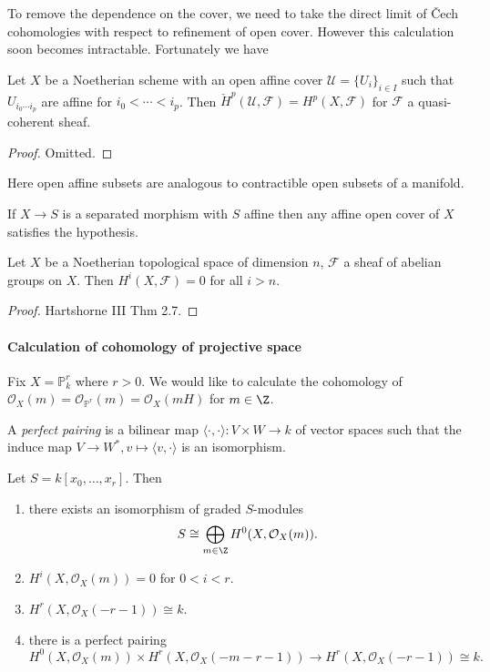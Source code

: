 \documentclass[a4paper]{article}
\renewcommand*{\P}{\mathbb{P}}
\newcommand{\sh}[1]{\mathcal{#1}} %
\begin{document}
To remove the dependence on the cover, we need to take the direct limit of Čech cohomologies with respect to refinement of open cover. However this calculation soon becomes intractable. Fortunately we have

\begin{theorem}
  Let \(X\) be a Noetherian scheme with an open affine cover \(\sh U = \{U_i\}_{i \in I}\) such that \(U_{i_0 \cdots i_p}\) are affine for \(i_0 < \cdots < i_p\). Then \(\check H^p(\mathcal U, \sh F) = H^p(X, \sh F)\) for \(\sh F\) a quasi-coherent sheaf.
\end{theorem}

\begin{proof}
  Omitted.
\end{proof}

Here open affine subsets are analogous to contractible open subsets of a manifold.

\begin{remark}
  If \(X \to S\) is a separated morphism with \(S\) affine then any affine open cover of \(X\) satisfies the hypothesis.
\end{remark}

\begin{theorem}[Grothendieck]
  Let \(X\) be a Noetherian topological space of dimension \(n\), \(\sh F\) a sheaf of abelian groups on \(X\). Then \(H^i(X, \sh F) = 0\) for all \(i > n\).
\end{theorem}

\begin{proof}
  Hartshorne III Thm 2.7.
\end{proof}

\paragraph{Calculation of cohomology of projective space}

Fix \(X = \P_k^r\) where \(r > 0\). We would like to calculate the cohomology of \(\sh O_X(m) = \sh O_{\P^r}(m) = \sh O_X(mH)\) for \(m \in \Z\).

\begin{definition}
  A \emph{perfect pairing} is a bilinear map \(\langle \cdot, \cdot \rangle: V \times W \to k\) of vector spaces such that the induce map \(V \to W^*, v \mapsto \langle v, \cdot \rangle\) is an isomorphism.
\end{definition}

\begin{theorem}
  Let \(S = k[x_0, \dots, x_r]\). Then
  \begin{enumerate}
  \item there exists an isomorphism of graded \(S\)-modules
    \[
      S \cong \bigoplus_{m \in \Z} H^0(X, \sh O_X(m)).
    \]
  \item \(H^i(X, \sh O_X(m)) = 0\) for \(0 < i < r\).
  \item \(H^r(X, \sh O_X(-r - 1)) \cong k\).
  \item there is a perfect pairing
    \[
      H^0(X, \sh O_X(m)) \times H^r(X, \sh O_X(-m - r - 1)) \to H^r(X, \sh O_X(-r - 1)) \cong k.
    \]
  \end{enumerate}
\end{theorem}
\end{document}

